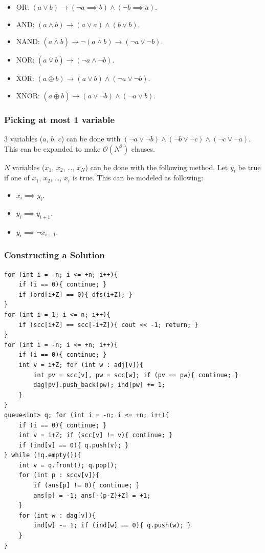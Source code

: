 \begin{itemize}
	\item OR: $(a \vee b) \to (\neg a \implies b) \wedge (\neg b \implies a)$.
	\item AND: $(a \wedge b) \to (a \vee a) \wedge (b \vee b)$.
	\item NAND: $(a \overline{\wedge} b) \to \neg (a \wedge b) \to (\neg a \vee \neg b)$.
	\item NOR: $(a \overline{\vee} b) \to (\neg a \wedge \neg b)$.
	\item XOR: $(a \oplus b) \to (a \vee b) \wedge (\neg a \vee \neg b)$.
	\item XNOR: $(a \overline{\oplus} b) \to (a \vee \neg b) \wedge (\neg a \vee b)$.
\end{itemize}

\subsubsection*{Picking at most 1 variable}
$3$ variables ($a$, $b$, $c$) can be done with $(\neg a \vee \neg b) \wedge (\neg b \vee \neg c) \wedge (\neg c \vee \neg a)$. This can be expanded to make $\mathcal O(N^2)$ clauses.

$N$ variables ($x_1$, $x_2$, \ldots, $x_N$) can be done with the following method. Let $y_i$ be true if one of $x_1$, $x_2$, \ldots, $x_i$ is true. This can be modeled as following:
\begin{itemize}
	\item $x_i \implies y_i$.
	\item $y_i \implies y_{i+1}$.
	\item $y_i \implies \neg x_{i+1}$.
\end{itemize}

\subsubsection*{Constructing a Solution}
\begin{verbatim}
for (int i = -n; i <= +n; i++){
	if (i == 0){ continue; }
	if (ord[i+Z] == 0){ dfs(i+Z); }
}
for (int i = 1; i <= n; i++){
	if (scc[i+Z] == scc[-i+Z]){ cout << -1; return; }
}
for (int i = -n; i <= +n; i++){
	if (i == 0){ continue; }
	int v = i+Z; for (int w : adj[v]){
		int pv = scc[v], pw = scc[w]; if (pv == pw){ continue; }
		dag[pv].push_back(pw); ind[pw] += 1;
	}
}
queue<int> q; for (int i = -n; i <= +n; i++){
	if (i == 0){ continue; }
	int v = i+Z; if (scc[v] != v){ continue; }
	if (ind[v] == 0){ q.push(v); }
} while (!q.empty()){
	int v = q.front(); q.pop();
	for (int p : sccv[v]){
		if (ans[p] != 0){ continue; }
		ans[p] = -1; ans[-(p-Z)+Z] = +1;
	}
	for (int w : dag[v]){
		ind[w] -= 1; if (ind[w] == 0){ q.push(w); }
	}
}
\end{verbatim}